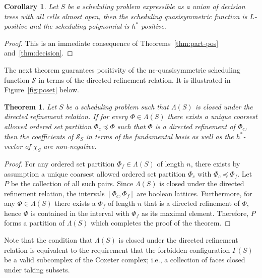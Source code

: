 \documentclass[12pt,reqno]{amsart}
\numberwithin{definition}{section}
\newtheorem{theorem}[definition]{Theorem}
\newtheorem{corollary}[definition]{Corollary}
\theoremstyle{definition}
\newcommand{\SSS}{\mathcal{S}}
\newcommand{\allow}{\Lambda} %
\newcommand{\poly}{\chi} %
\newcommand{\forb}{\Gamma} %
\begin{document}
\begin{corollary}
Let $S$ be a scheduling problem expressible as a union of decision trees with all cells almost open, then the scheduling quasisymmetric function is $L$-positive and the scheduling polynomial is $h^*$ positive. 
\end{corollary}
\begin{proof}
This is an immediate consequence of Theorems~\ref{thm:part-pos} and~\ref{thm:decision}.
\end{proof}

The next theorem guarantees positivity of the nc-quasisymmetric scheduling function $\SSS$ in terms of the directed refinement relation. It is illustrated in Figure~\ref{fig:poset} below.

\begin{theorem}
\label{unique}
Let $S$ be a scheduling problem such that $\allow(S)$ is closed under the directed refinement relation. If for every $\Phi \in \allow(S)$ there exists a \emph{unique} coarsest allowed ordered set partition $\Phi_c \preceq \Phi$ such that $\Phi$ is a directed refinement of $\Phi_c$, then the coefficients of $\SSS_S$ in terms of the fundamental basis as well as the $h^*$-vector of $\poly_S$ are non-negative.
\end{theorem}

\begin{proof}
For any  ordered set partition $\Phi_f \in \allow(S)$ of length $n$, there exists by assumption a unique coarsest allowed ordered set partition $\Phi_c$ with $\Phi_c\preceq\Phi_f$. Let $P$ be the collection of all such pairs.  Since $\allow(S)$ is closed under the directed refinement relation, the intervals  $[\Phi_c, \Phi_f]$ are boolean lattices.
Furthermore,  for any  $\Phi \in \allow(S)$ there exists a $\Phi_f$ of length $n$ that is a directed refinement of $\Phi$, hence $\Phi$ is contained in the interval with $\Phi_f$ as its maximal element. Therefore, $P$ forms a partition of $\allow(S)$  which completes the proof of the theorem.
\end{proof}


Note that the condition that $\allow(S)$ is closed under the directed
refinement relation is equivalent to the requirement that the forbidden
configuration $\forb(S)$ be a valid subcomplex of the Coxeter complex; i.e., a
collection of faces closed under taking subsets.
\end{document}
